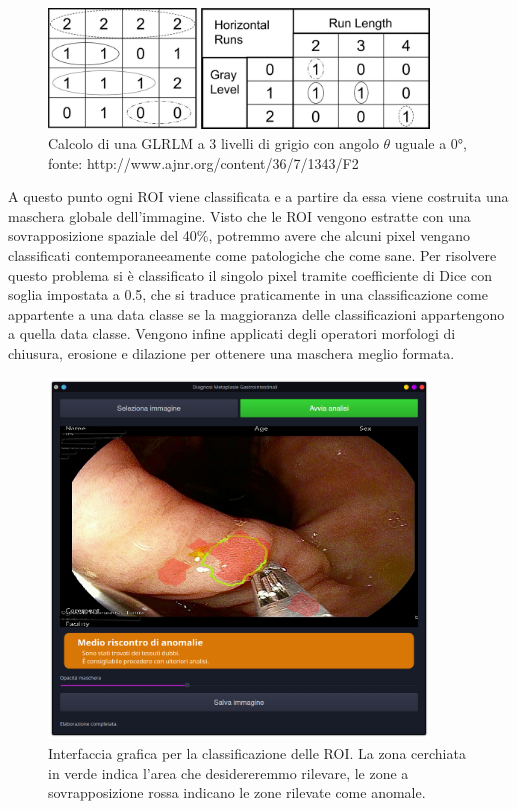 \begin{figure}[h]
    \center
    \includegraphics[width=0.9\textwidth]{./assets/glrlm.jpg}
    \caption{\label{fig:glrlm}Calcolo di una GLRLM a 3 livelli di grigio con angolo $\theta$ uguale a 0°, fonte: http://www.ajnr.org/content/36/7/1343/F2}
\end{figure}

A questo punto ogni ROI viene classificata e a partire da essa viene
costruita una maschera globale dell'immagine.
Visto che le ROI vengono estratte con una sovrapposizione spaziale del 40\%,
potremmo avere che alcuni pixel vengano classificati contemporaneeamente
come patologiche che come sane.
Per risolvere questo problema si è classificato il singolo pixel tramite
coefficiente di Dice con soglia impostata a 0.5, che si traduce
praticamente in una classificazione come appartente a una data classe
se la maggioranza delle classificazioni appartengono a quella data classe.
Vengono infine applicati degli operatori morfologi di chiusura, erosione e dilazione
per ottenere una maschera meglio formata.

\begin{figure}[h]
    \center
    \includegraphics[width=0.9\textwidth]{./assets/gui-one.png}
    \caption{\label{fig:gui-one}Interfaccia grafica per la classificazione delle ROI. La zona cerchiata in verde indica l'area che desidereremmo rilevare, le zone a sovrapposizione rossa indicano le zone rilevate come anomale.}
\end{figure}

